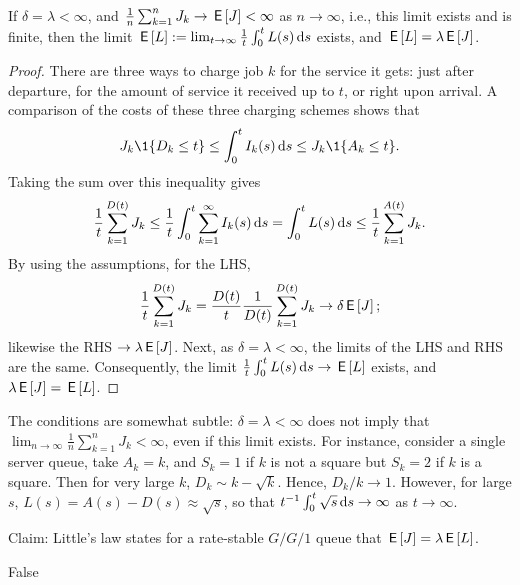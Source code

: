 \documentclass[stochastic-or.tex]{subfiles}
\begin{document}
\begin{theorem}[Little's Law, $\E L = \lambda \E J$]
If $\delta = \lambda < \infty$, and $\frac{1}{n}\sum_{k=1}^{n} J_{k} \to \,\mathsf{E}\left[J\right] < \infty$  as $n\to \infty$, i.e., this limit exists and is finite, then the limit $\,\mathsf{E}\left[L\right] := \lim_{t\to\infty} \frac{1}{t}\int_{0}^{t}L(s)\,\textrm{d}s$ exists, and $\E L = \lambda \E J$.
\end{theorem}
\begin{proof}
There are three ways to  charge job $k$ for the service it gets:  just after departure, for the amount of service it received up to $t$, or right upon arrival.
A comparison of the costs of these three charging schemes shows that
\begin{equation*}
J_{k} \1{D_k\leq t} \leq \int_0^t I_k(s) \d s \leq J_k \1{A_k \leq t}.
\end{equation*}
Taking the sum over this inequality gives
\begin{equation*}
\frac{1}{t} \sum_{k=1}^{D(t)} J_k \leq \frac{1}{t}\int_0^t \sum_{k=1}^{\infty} I_k(s) \,\textrm{d}s = \int_{0}^{t}L(s) \,\textrm{d}s \leq \frac{1}{t}\sum_{k=1}^{A(t)} J_{k}.
\end{equation*}
By using the assumptions, for the LHS,
\begin{equation*}
\frac{1}{t} \sum_{k=1}^{D(t)} J_k = \frac{D(t)}{t}\frac{1}{D(t)} \sum_{k=1}^{D(t)}J_k \to \delta \,\mathsf{E}\left[J\right];
\end{equation*}
likewise  the RHS $\to \lambda \,\mathsf{E}\left[J\right]$.
Next, as $\delta = \lambda< \infty$, the limits of the LHS and RHS are the same.
Consequently, the limit $\frac{1}{t}\int_{0}^t L(s) \,\textrm{d}s \to \,\mathsf{E}\left[L\right]$ exists, and $\lambda \,\mathsf{E}\left[J\right] = \,\mathsf{E}\left[L\right]$.
\end{proof}

The conditions are somewhat subtle: $\delta = \lambda < \infty$ does not imply that $\lim_{n\to\infty} \frac{1}{n}\sum_{k=1}^{n} J_{k} < \infty$, even if this limit exists.
For instance, consider a single server queue, take $A_k = k$, and $S_k = 1$ if $k$ is not a square but $S_k = 2$ if $k$ is a square.
Then for very large $k$, $D_k \sim k - \sqrt k$.
Hence, $D_k/k\to1$.
However, for large $s$, $L(s) = A(s) - D(s) \approx \sqrt s$, so that $t^{-1}\int_0^t\sqrt s \,\textrm{d}s \to \infty$ as $t\to \infty$.

\begin{truefalse}
Claim: Little's law states  for a rate-stable $G/G/1$ queue that $\,\mathsf{E}\left[J\right]=\lambda\,\mathsf{E}\left[L\right]$.
\begin{solution}
False
\end{solution}
\end{truefalse}
\end{document}
